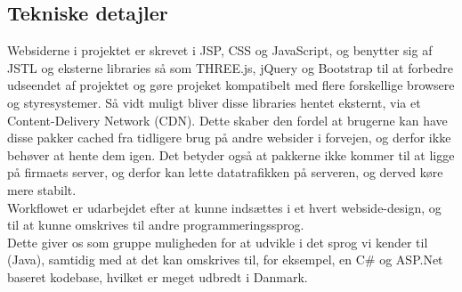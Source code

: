 \subsection{Tekniske detajler}
Websiderne i projektet er skrevet i JSP, CSS og JavaScript, og benytter sig af JSTL og eksterne libraries så som THREE.js, jQuery og Bootstrap til at forbedre udseendet af projektet og gøre projeket kompatibelt med flere forskellige browsere og styresystemer. Så vidt muligt bliver disse libraries hentet eksternt, via et Content-Delivery Network (CDN). Dette skaber den fordel at brugerne kan have disse pakker cached fra tidligere brug på andre websider i forvejen, og derfor ikke behøver at hente dem igen. Det betyder også at pakkerne ikke kommer til at ligge på firmaets server, og derfor kan lette datatrafikken på serveren, og derved køre mere stabilt.\\
Workflowet er udarbejdet efter at kunne indsættes i et hvert webside-design, og til at kunne omskrives til andre programmeringssprog.\\
Dette giver os som gruppe muligheden for at udvikle i det sprog vi kender til (Java), samtidig med at det kan omskrives til, for eksempel, en C\# og ASP.Net baseret kodebase, hvilket er meget udbredt i Danmark.